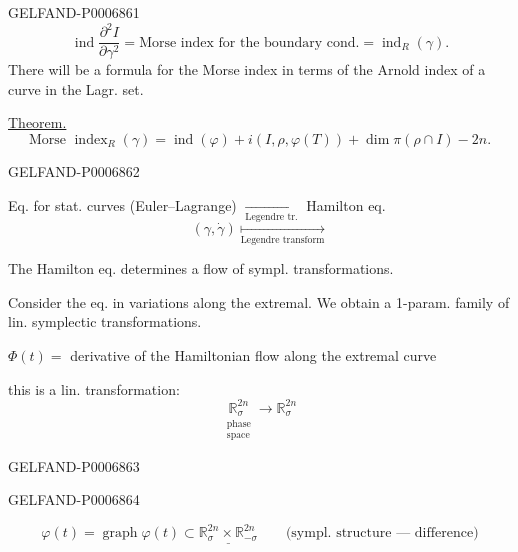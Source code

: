 \begin{GelfandAdjacentEvidence}{GELFAND-P000686}{1}
\[
\operatorname{ind}\frac{\partial^2 I}{\partial\gamma^2}
=\text{Morse index for the boundary cond.}=\operatorname{ind}_R(\gamma).
\]
There will be a formula for the Morse index in terms of the Arnold index of a curve in the Lagr. set.

\underline{Theorem.}
\[
\text{Morse }\operatorname{index}_R(\gamma)
=\operatorname{ind}(\varphi)+i(I,\rho,\varphi(T))
  +\dim\pi(\rho\cap I)-2n.
\]
\end{GelfandAdjacentEvidence}
\begin{GelfandAdjacentEvidence}{GELFAND-P000686}{2}


\noindent Eq. for stat. curves (Euler–Lagrange)
\(\underset{\text{Legendre tr.}}{\longrightarrow}\)
Hamilton eq.
\[
(\gamma,\dot\gamma)\underset{\text{Legendre transform}}{\mapsto}
\]

The Hamilton eq. determines a flow of sympl. transformations.

Consider the eq. in variations along the extremal. We obtain a 1-param. family of lin. symplectic transformations.

\(\Phi(t)=\) derivative of the Hamiltonian flow along the extremal curve

this is a lin. transformation:
\[
\underset{\substack{\text{phase}\\\text{space}}}{\mathbb R_\sigma^{2n}}
\longrightarrow \mathbb R_\sigma^{2n}
\]
\end{GelfandAdjacentEvidence}
\begin{GelfandAdjacentEvidence}{GELFAND-P000686}{3}

\end{GelfandAdjacentEvidence}
\begin{GelfandAdjacentEvidence}{GELFAND-P000686}{4}

\[
\varphi(t)=\operatorname{graph}\varphi(t)\subset
\underline{\mathbb R_\sigma^{2n}\times\mathbb R_{-\sigma}^{2n}}
\qquad \text{(sympl. structure --- difference)}
\]
\end{GelfandAdjacentEvidence}
